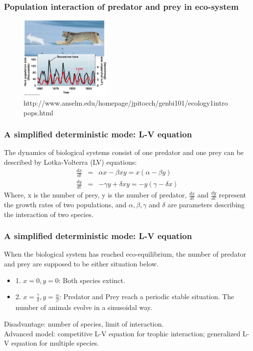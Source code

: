\documentclass{beamer}
\begin{document}
\frame
{
 	\frametitle{Population interaction of predator and prey in eco-system}
 
	\begin{figure}[htbp]
	\begin{center}
		\includegraphics[width=0.4\textwidth]{./pics/predator_prey2.jpeg}
	\caption{http://www.anselm.edu/homepage/jpitocch/genbi101/ecology1intropops.html}
	\label{default}
	\end{center}
	\end{figure} 
}

\frame
{
 	\frametitle{A simplified deterministic mode: L-V equation}
 	The dynamics of biological systems consist of one predator and one prey can be described by Lotka-Volterra (LV) equations:
 	\begin{eqnarray*}
 	\frac{dx}{dt} &=& \alpha x - \beta x y = x(\alpha - \beta y) \\
 	\frac{dy}{dt} &=& - \gamma y + \delta x y = - y (\gamma - \delta x)
 	\end{eqnarray*}
    Where, x is the number of prey, y is the number of predator, $\frac{dx}{dt}$ and $\frac{dy}{dt}$ represent the growth rates of two populations, and $\alpha, \beta, \gamma$ and $\delta$ are parameters describing the interaction of two species. \\
}

\frame
{
    \frametitle{A simplified deterministic mode: L-V equation}
     When the biological system has reached eco-equilibrium, the number of predator and prey are supposed to be either situation below.
    \begin{itemize}
    \item 1. $x = 0, y = 0$: Both species extinct. 
    \item 2. $x = \frac{\gamma}{\delta}, y = \frac{\alpha}{\beta}$: Predator and Prey reach a periodic stable situation. The number of animals evolve in a sinusoidal way.
    \end{itemize}
    \medskip \medskip
 	Disadvantage: number of species, limit of interaction. \\
    Advanced model: competitive L-V equation for trophic interaction; generalized L-V equation for multiple species.
}
\end{document}
